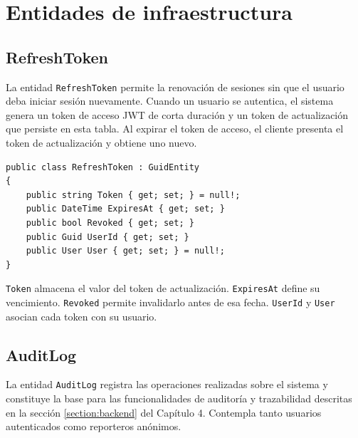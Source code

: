 \chapter{Entidades de infraestructura}
\label{anexo:entidades_infraestructura}

\section{RefreshToken}

La entidad \texttt{RefreshToken} permite la renovación de sesiones sin que el usuario deba iniciar sesión nuevamente. Cuando un usuario se autentica, el sistema genera un token de acceso JWT de corta duración y un token de actualización que persiste en esta tabla. Al expirar el token de acceso, el cliente presenta el token de actualización y obtiene uno nuevo.

\begin{lstlisting}[language={[Sharp]C}, caption={Entidad RefreshToken}, label={lst:refreshtoken}]
public class RefreshToken : GuidEntity
{
    public string Token { get; set; } = null!;
    public DateTime ExpiresAt { get; set; }
    public bool Revoked { get; set; }
    public Guid UserId { get; set; }
    public User User { get; set; } = null!;
}
\end{lstlisting}

\texttt{Token} almacena el valor del token de actualización. \texttt{ExpiresAt} define su vencimiento. \texttt{Revoked} permite invalidarlo antes de esa fecha. \texttt{UserId} y \texttt{User} asocian cada token con su usuario.


\section{AuditLog}

La entidad \texttt{AuditLog} registra las operaciones realizadas sobre el sistema y constituye la base para las funcionalidades de auditoría y trazabilidad descritas en la sección \ref{section:backend} del Capítulo 4. Contempla tanto usuarios autenticados como reporteros anónimos.

